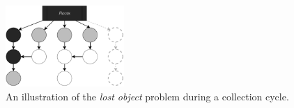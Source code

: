 \begin{figure}[ht]
  \caption{An illustration of the \textit{lost object} problem during a collection cycle.}
  \label{fig:lost-object}

  \centering
  \includegraphics[width=0.4\textwidth]{images/lost-object.pdf}
\end{figure}
